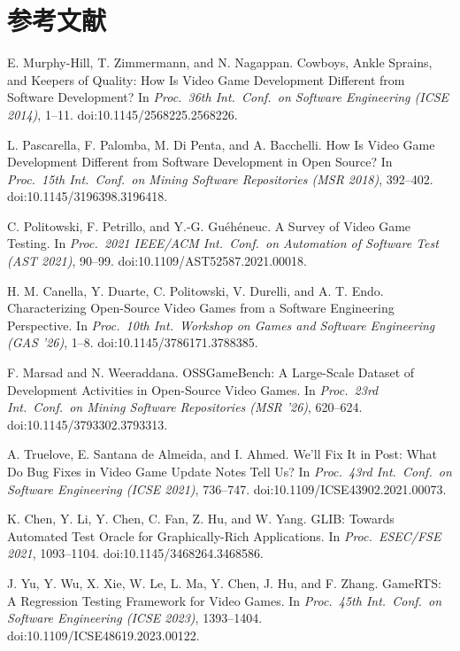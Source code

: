 \documentclass[a4paper,twocolumn,9pt]{ltjsarticle}
\begin{document}
\section*{参考文献}
\small
\begin{enumerate}[label={[\arabic*]},leftmargin=2.2em,itemsep=1pt]
\item E. Murphy-Hill, T. Zimmermann, and N. Nagappan. Cowboys, Ankle Sprains, and Keepers of Quality: How Is Video Game Development Different from Software Development? In \emph{Proc.\ 36th Int.\ Conf.\ on Software Engineering (ICSE 2014)}, 1--11. doi:10.1145/2568225.2568226.
\item L. Pascarella, F. Palomba, M. Di Penta, and A. Bacchelli. How Is Video Game Development Different from Software Development in Open Source? In \emph{Proc.\ 15th Int.\ Conf.\ on Mining Software Repositories (MSR 2018)}, 392--402. doi:10.1145/3196398.3196418.
\item C. Politowski, F. Petrillo, and Y.-G. Gu\'eh\'eneuc. A Survey of Video Game Testing. In \emph{Proc.\ 2021 IEEE/ACM Int.\ Conf.\ on Automation of Software Test (AST 2021)}, 90--99. doi:10.1109/AST52587.2021.00018.
\item H. M. Canella, Y. Duarte, C. Politowski, V. Durelli, and A. T. Endo. Characterizing Open-Source Video Games from a Software Engineering Perspective. In \emph{Proc.\ 10th Int.\ Workshop on Games and Software Engineering (GAS '26)}, 1--8. doi:10.1145/3786171.3788385.
\item F. Marsad and N. Weeraddana. OSSGameBench: A Large-Scale Dataset of Development Activities in Open-Source Video Games. In \emph{Proc.\ 23rd Int.\ Conf.\ on Mining Software Repositories (MSR '26)}, 620--624. doi:10.1145/3793302.3793313.
\item A. Truelove, E. Santana de Almeida, and I. Ahmed. We'll Fix It in Post: What Do Bug Fixes in Video Game Update Notes Tell Us? In \emph{Proc.\ 43rd Int.\ Conf.\ on Software Engineering (ICSE 2021)}, 736--747. doi:10.1109/ICSE43902.2021.00073.
\item K. Chen, Y. Li, Y. Chen, C. Fan, Z. Hu, and W. Yang. GLIB: Towards Automated Test Oracle for Graphically-Rich Applications. In \emph{Proc.\ ESEC/FSE 2021}, 1093--1104. doi:10.1145/3468264.3468586.
\item J. Yu, Y. Wu, X. Xie, W. Le, L. Ma, Y. Chen, J. Hu, and F. Zhang. GameRTS: A Regression Testing Framework for Video Games. In \emph{Proc.\ 45th Int.\ Conf.\ on Software Engineering (ICSE 2023)}, 1393--1404. doi:10.1109/ICSE48619.2023.00122.
\end{enumerate}
\normalsize
\end{document}
